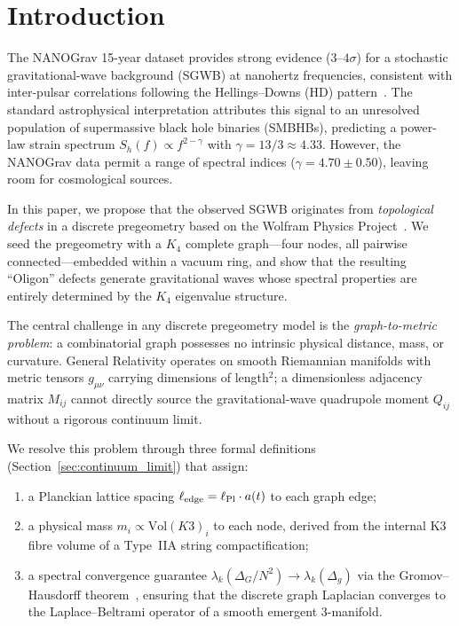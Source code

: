 \section{Introduction}
\label{sec:intro}

The NANOGrav 15-year dataset provides strong evidence ($3$--$4\sigma$) for a stochastic gravitational-wave background (SGWB) at nanohertz frequencies, consistent with inter-pulsar correlations following the Hellings--Downs (HD) pattern~\cite{NANOGrav2023}.  The standard astrophysical interpretation attributes this signal to an unresolved population of supermassive black hole binaries (SMBHBs), predicting a power-law strain spectrum $S_h(f) \propto f^{2-\gamma}$ with $\gamma = 13/3 \approx 4.33$.  However, the NANOGrav data permit a range of spectral indices ($\gamma = 4.70 \pm 0.50$), leaving room for cosmological sources.

In this paper, we propose that the observed SGWB originates from \emph{topological defects} in a discrete pregeometry based on the Wolfram Physics Project~\cite{Wolfram2020}.  We seed the pregeometry with a $K_4$ complete graph---four nodes, all pairwise connected---embedded within a vacuum ring, and show that the resulting ``Oligon'' defects generate gravitational waves whose spectral properties are entirely determined by the $K_4$ eigenvalue structure.

The central challenge in any discrete pregeometry model is the \emph{graph-to-metric problem}: a combinatorial graph possesses no intrinsic physical distance, mass, or curvature.  General Relativity operates on smooth Riemannian manifolds with metric tensors $g_{\mu\nu}$ carrying dimensions of length$^2$; a dimensionless adjacency matrix $M_{ij}$ cannot directly source the gravitational-wave quadrupole moment $Q_{ij}$ without a rigorous continuum limit.

We resolve this problem through three formal definitions (Section~\ref{sec:continuum_limit}) that assign:
\begin{enumerate}
    \item a Planckian lattice spacing $\ell_{\rm edge} = \ell_{\rm Pl} \cdot a(t)$ to each graph edge;
    \item a physical mass $m_i \propto \mathrm{Vol}(K3)_i$ to each node, derived from the internal K3 fibre volume of a Type~IIA string compactification;
    \item a spectral convergence guarantee $\lambda_k(\Delta_G/N^2) \to \lambda_k(\Delta_g)$ via the Gromov--Hausdorff theorem~\cite{Burago2006}, ensuring that the discrete graph Laplacian converges to the Laplace--Beltrami operator of a smooth emergent 3-manifold.
\end{enumerate}

